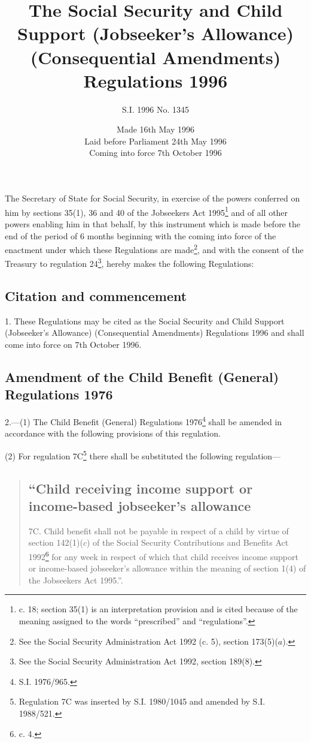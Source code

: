 \documentclass[a4paper]{article}
\title{The Social Security and Child Support (Jobseeker’s Allowance) (Consequential Amendments) Regulations 1996}
\author{S.I. 1996 No. 1345}
\date{Made 16th May 1996\\Laid before Parliament 24th May 1996\\Coming into force 7th October 1996
}
\begin{document}
\maketitle

\noindent
The Secretary of State for Social Security, in exercise of the powers conferred on him by sections 35(1), 36 and 40 of the Jobseekers Act 1995\footnote{ c. 18; section 35(1) is an interpretation provision and is cited because of the meaning assigned to the words “prescribed” and “regulations”.} and of all other powers enabling him in that behalf, by this instrument which is made before the end of the period of 6 months beginning with the coming into force of the enactment under which these Regulations are made\footnote{\frenchspacing See the Social Security Administration Act 1992 (c. 5), section 173(5)($a$).}, and with the consent of the Treasury to regulation 24\footnote{\frenchspacing See the Social Security Administration Act 1992, section 189(8).}, hereby makes the following Regulations:


{\sloppy

\tableofcontents

}

\setcounter{secnumdepth}{-2}

\subsection[1. Citation and commencement]{Citation and commencement}

1.  These Regulations may be cited as the Social Security and Child Support (Jobseeker’s Allowance) (Consequential Amendments) Regulations 1996 and shall come into force on 7th October 1996.

\subsection[2. Amendment of the Child Benefit (General) Regulations 1976]{Amendment of the Child Benefit (General) Regulations 1976}

2.—(1) The Child Benefit (General) Regulations 1976\footnote{\frenchspacing S.I. 1976/965.} shall be amended in accordance with the following provisions of this regulation.

(2) For regulation 7C\footnote{\frenchspacing Regulation 7C was inserted by S.I. 1980/1045 and amended by S.I. 1988/521.} there shall be substituted the following regulation—
\begin{quotation}
\subsection*{“Child receiving income support or income-based jobseeker’s allowance}

7C.  Child benefit shall not be payable in respect of a child by virtue of section 142(1)($c$) of the Social Security Contributions and Benefits Act 1992\footnote{ c. 4.} for any week in respect of which that child receives income support or income-based jobseeker’s allowance within the meaning of section 1(4) of the Jobseekers Act 1995.”.
\end{quotation}
\end{document}
